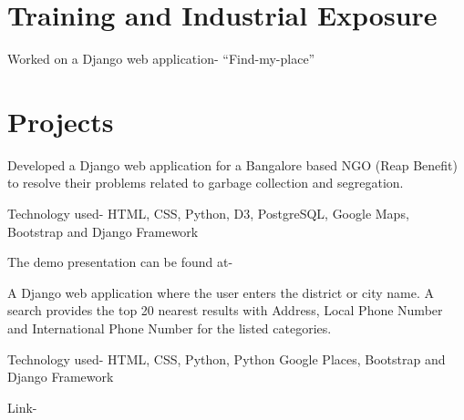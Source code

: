 \documentclass[]{deedy-resume-openfont}
\begin{document}
\hfill
\begin{minipage}[t]{0.66\textwidth} 


\section{Training and Industrial Exposure}

\vspace{\topsep} %
\begin{tightemize}\item Worked on a Django web application- “Find-my-place”
\end{tightemize}

\sectionsep


\section{Projects}

Developed a Django web application for a Bangalore based NGO (Reap Benefit) to resolve their problems related to garbage collection and segregation. \\
\begin{tightemize}
\item Technology used- HTML, CSS, Python, D3, PostgreSQL, Google Maps, Bootstrap and Django Framework
\item The demo presentation can be found at- \href{https:/youtu.be/UP_KwSg6GIk/}{}
\end{tightemize}
\sectionsep

A Django web application where the user enters the district or city name. A search provides the top 20 nearest results with Address, Local Phone Number and International Phone Number for the listed categories. 
\begin{tightemize}
\item Technology used- HTML, CSS, Python, Python Google Places, Bootstrap and Django Framework
\item Link- \href{https://find-my-perfect-place.herokuapp.com/}{}
\end{tightemize}
\sectionsep


\end{minipage}
\end{document}
